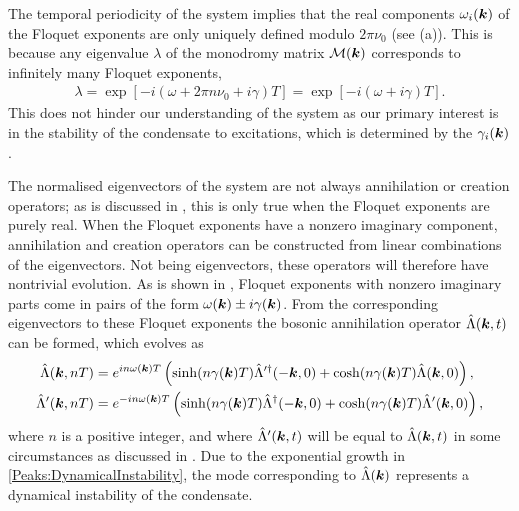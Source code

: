 The temporal periodicity of the system implies that the real components $\omega_i(\bm{k})$ of the Floquet exponents are only uniquely defined modulo $2\pi \nu_0$ (see (a)). This is because any eigenvalue $\lambda$ of the monodromy matrix $\mathcal{M}(\bm{k})$ corresponds to infinitely many Floquet exponents,
\begin{align}
    \label{Peaks:AmbiguityFloquetExponent}
    \lambda = \exp\left[-i \left(\omega + 2 \pi n \nu_0 + i \gamma\right)T\right] = \exp\left[-i\left(\omega + i \gamma\right)T\right].
\end{align}
This does not hinder our understanding of the system as our primary interest is in the stability of the condensate to excitations, which is determined by the $\gamma_i(\bm{k})$.

The normalised eigenvectors of the system are not always annihilation or creation operators; as is discussed in , this is only true when the Floquet exponents are purely real. When the Floquet exponents have a nonzero imaginary component, annihilation and creation operators can be constructed from linear combinations of the eigenvectors. Not being eigenvectors, these operators will therefore have nontrivial evolution. As is shown in , Floquet exponents with nonzero imaginary parts come in pairs of the form $\omega(\bm{k}) \pm i \gamma(\bm{k})$. From the corresponding eigenvectors to these Floquet exponents the bosonic annihilation operator $\hat{\Lambda}(\bm{k}, t)$ can be formed, which evolves as
\begin{subequations}
    \label{Peaks:DynamicalInstability}
    \begin{align}
        \hat{\Lambda}(\vect{k}, nT) &= e^{i n\omega(\vect{k}) T} \left( \sinh(n\gamma(\vect{k}) T) \hat{\Lambda}'^\dagger(-\vect{k}, 0) + \cosh(n\gamma(\vect{k}) T) \hat{\Lambda}(\vect{k}, 0)\right),\\
        \hat{\Lambda}'(\vect{k}, nT) &= e^{-i n \omega(\vect{k}) T} \left( \sinh(n\gamma(\vect{k}) T) \hat{\Lambda}^\dagger(-\vect{k}, 0) + \cosh(n\gamma(\vect{k}) T) \hat{\Lambda}'(\vect{k}, 0)\right),
    \end{align}
\end{subequations}
where $n$ is a positive integer, and where $\hat{\Lambda}'(\bm{k}, t)$ will be equal to $\hat{\Lambda}(\bm{k}, t)$ in some circumstances as discussed in . Due to the exponential growth in \eqref{Peaks:DynamicalInstability}, the mode corresponding to $\hat{\Lambda}(\bm{k})$ represents a dynamical instability of the condensate.

